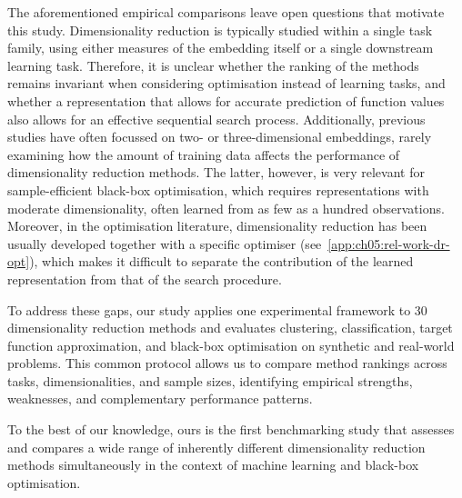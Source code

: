 The aforementioned empirical comparisons leave open questions that motivate this study.
Dimensionality reduction is typically studied within a single task family, using either measures of the embedding itself or a single downstream learning task.
Therefore, it is unclear whether the ranking of the methods remains invariant when considering optimisation instead of learning tasks, and whether a representation that allows for accurate prediction of function values also allows for an effective sequential search process.
Additionally, previous studies have often focussed on two- or three-dimensional embeddings, rarely examining how the amount of training data affects the performance of dimensionality reduction methods. The latter, however, is very relevant for sample-efficient black-box optimisation, which requires representations with moderate dimensionality, often learned from as few as a hundred observations. Moreover, in the optimisation literature, dimensionality reduction has been usually developed together with a specific optimiser (see~\cref{app:ch05:rel-work-dr-opt}), which makes it difficult to separate the contribution of the learned representation from that of the search procedure.

To address these gaps,
our study applies one experimental framework to 30 dimensionality reduction methods and evaluates clustering, classification, target function approximation, and black-box optimisation on synthetic and real-world problems.
This common protocol allows us to compare method rankings across tasks, dimensionalities, and sample sizes, identifying empirical strengths, weaknesses, and complementary performance patterns.

To the best of our knowledge,
ours is the first benchmarking study that assesses and compares a wide range of inherently different dimensionality reduction methods simultaneously in the context of machine learning and black-box optimisation.

